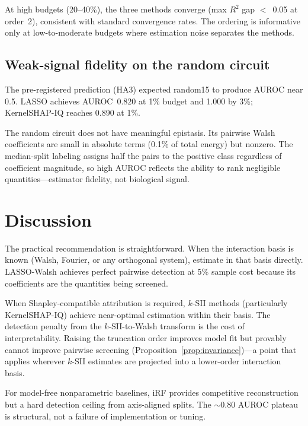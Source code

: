 \documentclass[10pt]{article}
\begin{document}
At high budgets (20--40\%), the three methods converge
(max $R^2$ gap $<$~0.05 at order~2), consistent with standard
convergence rates. The ordering is informative only at low-to-moderate
budgets where estimation noise separates the methods.


\subsection{Weak-signal fidelity on the random circuit}
\label{sec:weak-signal}

The pre-registered prediction (HA3) expected random15 to produce
AUROC near 0.5. LASSO achieves AUROC~$0.820$ at 1\% budget and
1.000 by 3\%; KernelSHAP-IQ reaches 0.890 at 1\%.

The random circuit does not have meaningful epistasis. Its pairwise
Walsh coefficients are small in absolute terms (0.1\% of total
energy) but nonzero. The median-split labeling assigns half the
pairs to the positive class regardless of coefficient magnitude,
so high AUROC reflects the ability to rank negligible
quantities---estimator fidelity, not biological signal.


\section{Discussion}
\label{sec:discussion}

The practical recommendation is straightforward. When the
interaction basis is known (Walsh, Fourier, or any orthogonal
system), estimate in that basis directly. LASSO-Walsh achieves
perfect pairwise detection at 5\% sample cost because its
coefficients are the quantities being screened.

When Shapley-compatible attribution is required, $k$-SII methods
(particularly KernelSHAP-IQ) achieve near-optimal estimation
within their basis. The detection penalty from the
$k$-SII-to-Walsh transform is the cost of interpretability.
Raising the truncation order improves model fit but provably
cannot improve pairwise screening
(Proposition~\ref{prop:invariance})---a point that applies
wherever $k$-SII estimates are projected into a lower-order
interaction basis.

For model-free nonparametric baselines, iRF provides competitive
reconstruction but a hard detection ceiling from axis-aligned
splits. The $\sim$0.80 AUROC plateau is structural, not a failure
of implementation or tuning.
\end{document}
